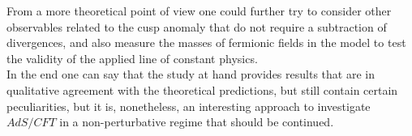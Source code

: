 From a more theoretical point of view one could further try to consider other observables related to the cusp anomaly that do not require a subtraction of divergences, and also measure the masses of fermionic fields in the model to test the validity of the applied line of constant physics.\\
In the end one can say that the study at hand provides results that are in qualitative agreement with the theoretical predictions, but still contain certain peculiarities, but it is, nonetheless, an interesting approach to investigate $AdS/CFT$ in a non-perturbative regime that should be continued.
